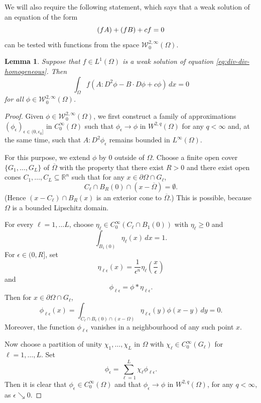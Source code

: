 \documentclass[a4paper]{article}
\newcommand{\R}{\mathbb{R}}
\newcommand{\W}{\mathcal{W}}
\let\div\relax\DeclareMathOperator{\div}{div}
\newtheorem{lemma}[theorem]{Lemma}
\theoremstyle{remark}
\begin{document}
We will also require the following statement, which says that a weak
solution of an equation of the form
\begin{equation} \label{eq:div-div-homogeneous}
\div \div (fA) + \div(fB) + cf = 0
\end{equation}
can be tested with functions from the space $\W_0^{2, \infty}(\Omega)$.

\begin{lemma} \label{lem:distributional-solutions}
Suppose that $f \in L^1(\Omega)$ is a weak solution of equation
\eqref{eq:div-div-homogeneous}. Then
\[
\int_\Omega f(A : D^2\phi - B \cdot D\phi + c\phi) \, dx = 0
\]
for all $\phi \in \W_0^{2, \infty}(\Omega)$.
\end{lemma}

\begin{proof}
Given $\phi \in \W_0^{2, \infty}(\Omega)$, we first construct a family of
approximations $(\phi_\epsilon)_{\epsilon \in (0, \epsilon_0]}$ in
$C_0^\infty(\Omega)$ such that $\phi_\epsilon \to \phi$ in $W^{2, q}(\Omega)$
for any $q < \infty$ and, at the same time, such that $A : D^2\phi_\epsilon$
remains bounded in $L^\infty(\Omega)$.

For this purpose, we extend $\phi$ by $0$ outside of $\Omega$.
Choose a finite open cover $\{G_1, \dotsc, G_L\}$ of
$\overline{\Omega}$ with the property that there exist $R > 0$ and
there exist open cones $C_1, \dotsc, C_L \subseteq \R^n$ such that
for any $x \in \partial \Omega \cap G_\ell$,
\[
C_\ell \cap B_R(0) \cap (x - \overline{\Omega}) = \emptyset.
\]
(Hence $(x - C_\ell) \cap B_R(x)$ is an exterior cone to $\overline{\Omega}$.)
This is possible, because $\Omega$ is a bounded Lipschitz domain.

For every $\ell = 1, \dotsc L$, choose $\eta_\ell \in C_0^\infty(C_\ell \cap B_1(0))$ with $\eta_\ell \ge 0$ and
\[
\int_{B_1(0)} \eta_\ell(x) \, dx = 1.
\]
For $\epsilon \in (0, R]$, set
\[
\eta_{\ell\epsilon}(x) = \frac{1}{\epsilon^n} \eta_\ell\left(\frac{x}{\epsilon}\right)
\]
and
\[
\phi_{\ell\epsilon} = \phi * \eta_{\ell\epsilon}.
\]
Then for $x \in \partial \Omega \cap G_\ell$,
\[
\phi_{\ell\epsilon}(x) = \int_{C_\ell \cap B_\epsilon(0) \cap (x - \Omega)} \eta_{\ell\epsilon}(y) \phi(x - y) \, dy = 0.
\]
Moreover, the function $\phi_{\ell\epsilon}$ vanishes in a neighbourhood of
any such point $x$.

Now choose a partition of unity $\chi_1, \dotsc, \chi_L$ in $\Omega$ with
$\chi_\ell \in C_0^\infty(G_\ell)$ for $\ell = 1, \dotsc, L$. Set
\[
\phi_\epsilon = \sum_{\ell = 1}^L \chi_\ell \phi_{\ell\epsilon}.
\]
Then it is clear that $\phi_\epsilon \in C_0^\infty(\Omega)$ and that
$\phi_\epsilon \to \phi$ in $W^{2, q}(\Omega)$, for any $q < \infty$, as
$\epsilon \searrow 0$.


\end{proof}
\end{document}
